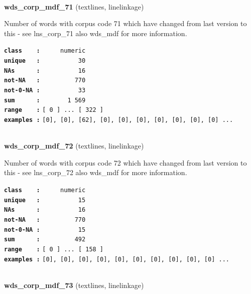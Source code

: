 \documentclass[]{article}
\begin{document}
~

\textbf{wds\_corp\_mdf\_71} (textlines, linelinkage)

Number of words with corpus code 71 which have changed from last version
to this - see lns\_corp\_71 also wds\_mdf for more information.

\textbf{\texttt{class\ \ \ \ :}} \texttt{~~~~~numeric}\\
\textbf{\texttt{unique\ \ \ :}} \texttt{~~~~~~~~~~30}\\
\textbf{\texttt{NAs\ \ \ \ \ \ :}} \texttt{~~~~~~~~~~16}\\
\textbf{\texttt{not-NA\ \ \ :}} \texttt{~~~~~~~~~770}\\
\textbf{\texttt{not-0-NA\ :}} \texttt{~~~~~~~~~~33}\\
\textbf{\texttt{sum\ \ \ \ \ \ :}} \texttt{~~~~~~~1~569}\\
\textbf{\texttt{range\ \ \ \ :}}
\texttt{{[}\ 0\ {]}\ ...\ {[}\ 322\ {]}}\\
\textbf{\texttt{examples\ :}}
\texttt{{[}0{]},\ {[}0{]},\ {[}62{]},\ {[}0{]},\ {[}0{]},\ {[}0{]},\ {[}0{]},\ {[}0{]},\ {[}0{]},\ {[}0{]}\ ...}\\

~

\textbf{wds\_corp\_mdf\_72} (textlines, linelinkage)

Number of words with corpus code 72 which have changed from last version
to this - see lns\_corp\_72 also wds\_mdf for more information.

\textbf{\texttt{class\ \ \ \ :}} \texttt{~~~~~numeric}\\
\textbf{\texttt{unique\ \ \ :}} \texttt{~~~~~~~~~~15}\\
\textbf{\texttt{NAs\ \ \ \ \ \ :}} \texttt{~~~~~~~~~~16}\\
\textbf{\texttt{not-NA\ \ \ :}} \texttt{~~~~~~~~~770}\\
\textbf{\texttt{not-0-NA\ :}} \texttt{~~~~~~~~~~15}\\
\textbf{\texttt{sum\ \ \ \ \ \ :}} \texttt{~~~~~~~~~492}\\
\textbf{\texttt{range\ \ \ \ :}}
\texttt{{[}\ 0\ {]}\ ...\ {[}\ 158\ {]}}\\
\textbf{\texttt{examples\ :}}
\texttt{{[}0{]},\ {[}0{]},\ {[}0{]},\ {[}0{]},\ {[}0{]},\ {[}0{]},\ {[}0{]},\ {[}0{]},\ {[}0{]},\ {[}0{]}\ ...}\\

~

\textbf{wds\_corp\_mdf\_73} (textlines, linelinkage)
\end{document}
